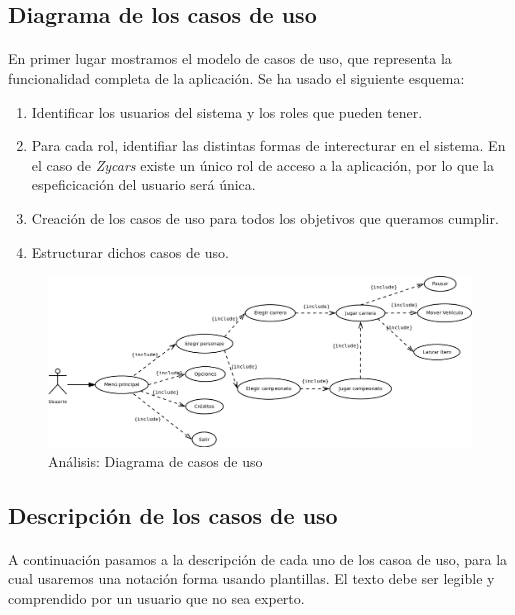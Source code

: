 \subsection{Diagrama de los casos de uso}

\paragraph{}
En primer lugar mostramos el modelo de casos de uso, que representa la funcionalidad completa de la aplicación. Se ha usado el 
siguiente esquema:

\begin{enumerate}
    \item Identificar los usuarios del sistema y los roles que pueden tener.
    \item Para cada rol, identifiar las distintas formas de interecturar en el sistema. En el caso de \emph{Zycars} existe
    un único rol de acceso a la aplicación, por lo que la espeficicación del usuario será única.
    \item Creación de los casos de uso para todos los objetivos que queramos cumplir.
    \item Estructurar dichos casos de uso.
\end{enumerate}

\begin{figure}[H]
  \label{diagrama_casos_uso}
  \begin{flushleft}
    \includegraphics[scale=0.45]{imagenes/analisis/diagrama_casos.png}
  \end{flushleft}
  \caption{Análisis: Diagrama de casos de uso}
\end{figure}

\subsection{Descripción de los casos de uso}

\paragraph{}
A continuación pasamos a la descripción de cada uno de los casoa de uso, para la cual usaremos una notación forma usando plantillas.
El texto debe ser legible y comprendido por un usuario que no sea experto.

